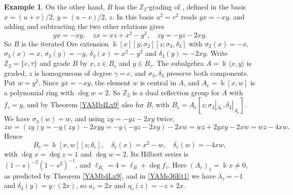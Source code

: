 \documentclass[reqno]{amsart}
\numberwithin{equation}{section}
\theoremstyle{definition}
\newtheorem{example}[equation]{Example}
\theoremstyle{remark}
\theoremstyle{plain}
\newcommand{\kk}{\Bbbk}
\begin{document}
\begin{example}
On the other hand, $B$ has the $\mathbb Z_2$-grading of \cite[Remark 5.16]{BR}, defined in the basis $x=(u+v)/2$, $y=(u-v)/2$, $z$. In this basis $u^2=v^2$ reads $yx=-xy$, and adding and subtracting the two other relations gives
\begin{equation}\label{YAMe12Br6}
yx=-xy,\quad zx=xz+x^2-y^2,\quad zy=-yz-2xy.
\end{equation}
So $B$ is the iterated Ore extension $\kk[x][y;\sigma_2][z;\sigma_3,\delta_3]$ with $\sigma_2(x)=-x$, $\sigma_3(x)=x$, $\sigma_3(y)=-y$, $\delta_3(x)=x^2-y^2$ and $\delta_3(y)=-2xy$. Write $\mathbb Z_2=\{e,\tau\}$ and grade $B$ by $x,z\in B_e$ and $y\in B_\tau$. The subalgebra $A=\kk\langle x,y\rangle$ is graded, $z$ is homogeneous of degree $\gamma=e$, and $\sigma_3,\delta_3$ preserve both components. Put $w=y^2$. Since $yx=-xy$, the element $w$ is central in $A$, and $A_e=\kk[x,w]$ is a polynomial ring with $\deg w=2$. So $\mathbb Z_2$ is a dual reflection group for $A$ with $f_\tau=y$, and by Theorem \ref{YAMb4Lx9} also for $B$, with $B_e=A_e[z;\sigma_3|_{A_e},\delta_3|_{A_e}]$. We have $\sigma_3(w)=w$, and using $zy=-yz-2xy$ twice,
\[
zw=(zy)y=-y(zy)-2xyy=-y(-yz-2xy)-2xw=wz+2yxy-2xw=wz-4xw.
\]
Hence
\begin{equation}\label{YAMe12Br7}
B_e=\kk[x,w][z;\delta_e],\quad\delta_e(x)=x^2-w,\quad\delta_e(w)=-4xw,
\end{equation}
with $\deg x=\deg z=1$ and $\deg w=2$. Its Hilbert series is $(1-s)^{-2}(1-s^2)^{-1}$, and $\ell_{B_e}=4=\ell_B+\deg f_\tau$. Here $(A_e)_1=\kk x\neq0$, as predicted by Theorem \ref{YAMb4Lx9}, and in \eqref{YAMe36Et1} we have $\lambda_\tau=-1$ and $\delta_3(y)=y\cdot(2x)$, so $a_\tau=2x$ and $\eta_\tau(z)=-z+2x$.
\end{example}
\end{document}
